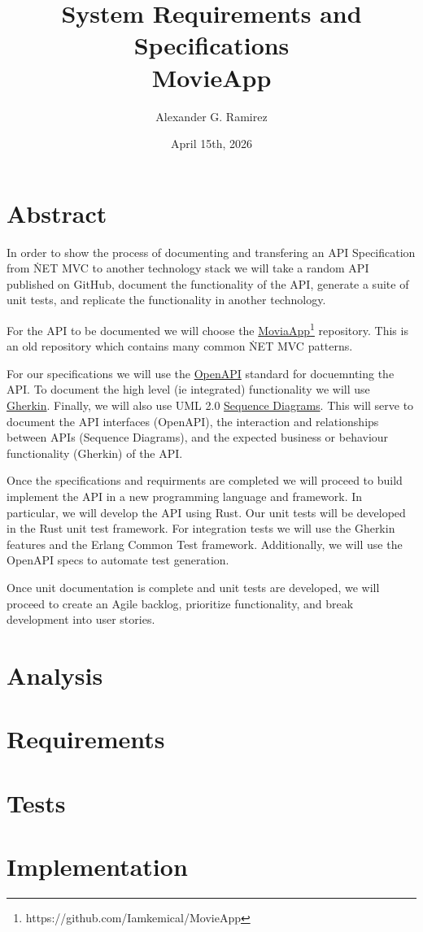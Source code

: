 \documentclass{report}
\title{System Requirements and Specifications \- \\ \large{MovieApp} }
\author{Alexander G. Ramirez}
\date{April 15th, 2026}
\begin{document}
\maketitle
\tableofcontents

\chapter{Abstract}


In order to show the process of documenting and transfering an API Specification
from \.NET MVC to another technology stack we will take a random API published on 
GitHub, document the functionality of the API, generate a suite of unit tests, 
and replicate the functionality in another technology.

For the API to be documented we will choose the 
\href{https://github.com/Iamkemical/MovieApp}{MoviaApp}\footnote{https://github.com/Iamkemical/MovieApp}
repository.  This is an old repository which contains many common \.NET MVC patterns.

For our specifications we will use the \href{https://www.openapis.org/}{OpenAPI} standard for docuemnting 
the API.  To document the high level (ie integrated) functionality we will use \href{https://cucumber.io/docs/}{Gherkin}.
Finally, we will also use UML 2.0 \href{https://en.wikipedia.org/wiki/Sequence_diagram}{Sequence Diagrams}.
This will serve to document the API interfaces (OpenAPI), the interaction and relationships between APIs 
(Sequence Diagrams), and the expected business or behaviour functionality (Gherkin) of the API.

Once the specifications and requirments are completed we will proceed to build implement the API in a new
programming language and framework.  In particular, we will develop the API using Rust.  Our unit tests 
will be developed in the Rust unit test framework.  For integration tests we will use the Gherkin features
and the Erlang Common Test framework.  Additionally, we will use the OpenAPI specs to automate test 
generation.

Once unit documentation is complete and unit tests are developed, we will proceed to create an Agile
backlog, prioritize functionality, and break development into user stories.

\chapter{Analysis}



\chapter{Requirements}

\chapter{Tests}

\chapter{Implementation}
\end{document}

